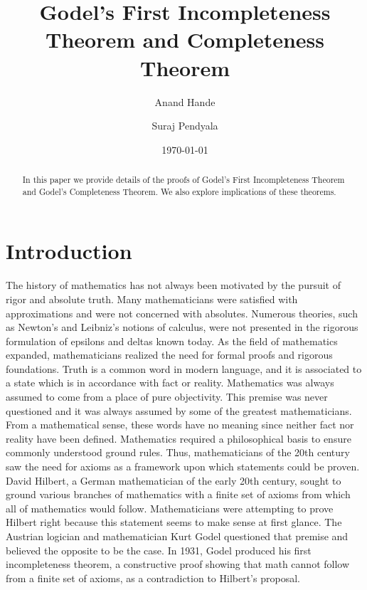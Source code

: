 \documentclass[%
 reprint,
 amsmath,amssymb,
 aps,
]{revtex4-2}
\begin{document}

\title{Godel's First Incompleteness Theorem and Completeness Theorem}%
%

\author{Anand Hande}
\author{Suraj Pendyala}




\date{\today}%

\begin{abstract}
In this paper we provide details of the proofs of Godel's First Incompleteness Theorem and Godel's Completeness Theorem.  We also explore implications of these theorems.  
\end{abstract}

\maketitle


\section{\label{Intro}Introduction}
The history of mathematics has not always been motivated by the pursuit of rigor and absolute truth. Many mathematicians were satisfied with approximations and were not concerned with absolutes. Numerous theories, such as Newton's and Leibniz's notions of calculus, were not presented in the rigorous formulation of epsilons and deltas known today.  As the field of mathematics expanded, mathematicians realized the need for formal proofs and rigorous foundations.  Truth is a common word in modern language, and it is associated to a state which is in accordance with fact or reality. Mathematics was always assumed to come from a place of pure objectivity. This premise was never questioned and it was always assumed by some of the greatest mathematicians.  From a mathematical sense, these words have no meaning since neither fact nor reality have been defined. Mathematics required a philosophical basis to ensure commonly understood ground rules. Thus, mathematicians of the 20th century saw the need for axioms as a framework upon which statements could be proven.  David Hilbert, a German mathematician of the early 20th century, sought to ground various branches of mathematics with a finite set of axioms from which all of mathematics would follow.  Mathematicians were attempting to prove Hilbert right because this statement seems to make sense at first glance. The Austrian logician and mathematician Kurt Godel questioned that premise and believed the opposite to be the case. In 1931, Godel produced his first incompleteness theorem, a constructive proof showing that math cannot follow from a finite set of axioms, as a contradiction to Hilbert's proposal.
\end{document}
